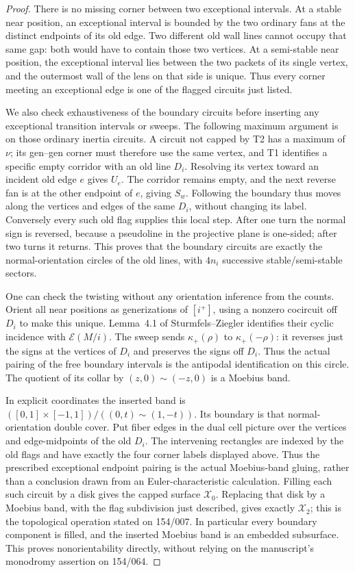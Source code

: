 \documentclass[11pt,a4paper]{article}
\begin{document}
\begin{proof}
There is no missing corner between two exceptional intervals. At a
stable near position, an exceptional interval is bounded by the two
ordinary fans at the distinct endpoints of its old edge. Two different
old wall lines cannot occupy that same gap: both would have to contain
those two vertices. At a semi-stable near position, the exceptional
interval lies between the two packets of its single vertex, and the
outermost wall of the lens on that side is unique. Thus every corner
meeting an exceptional edge is one of the flagged circuits just listed.

We also check exhaustiveness of the boundary circuits before inserting
any exceptional transition intervals or sweeps. The following maximum
argument is on those ordinary inertia circuits. A circuit not capped by T2 has a maximum of
$\nu$; its gen--gen corner must therefore use the same vertex, and
T1 identifies a specific empty corridor with an old line $D_i$.
Resolving its vertex toward an incident old edge $e$ gives $U_e$.
The corridor remains empty, and the next reverse fan is at the other
endpoint of $e$, giving $S_w$. Following the boundary thus moves along
the vertices and edges of the same $D_i$, without changing its label.
Conversely every such old flag supplies this local step. After one
turn the normal sign is reversed, because a pseudoline in the
projective plane is one-sided; after two turns it returns. This proves
that the boundary circuits are exactly the normal-orientation circles
of the old lines, with $4n_i$ successive stable/semi-stable sectors.

One can check the twisting without any orientation inference from the
counts. Orient all near positions as generizations of $[i^+]$, using
a nonzero cocircuit off $D_i$ to make this unique. Lemma~4.1 of
Sturmfels--Ziegler identifies their cyclic incidence with
$\mathcal E(M/i)$. The sweep sends
$\kappa_+(\rho)$ to $\kappa_+(-\rho)$: it reverses just the signs at
the vertices of $D_i$ and preserves the signs off $D_i$.
Thus the actual pairing of the free boundary intervals is the
antipodal identification on this circle. The quotient of its collar
by $(z,0)\sim(-z,0)$ is a Moebius band.

In explicit coordinates the inserted band is
$([0,1]\times[-1,1])/((0,t)\sim(1,-t))$.
Its boundary is that normal-orientation double cover. Put fiber edges
in the dual cell picture over the vertices and edge-midpoints of the
old $D_i$. The intervening
rectangles are indexed by the old flags and have exactly the four
corner labels displayed above. Thus the prescribed exceptional
endpoint pairing is the actual Moebius-band gluing, rather than a
conclusion drawn from an Euler-characteristic calculation.
Filling each such circuit by a disk gives the capped surface
$\mathcal X_0$. Replacing that disk by a Moebius band, with the flag
subdivision just described, gives exactly $\mathcal X_2$; this is the
topological operation stated on 154/007. In particular every boundary
component is filled, and the inserted Moebius band is an embedded
subsurface. This proves nonorientability directly, without relying on
the manuscript's monodromy assertion on 154/064.


\end{proof}
\end{document}
